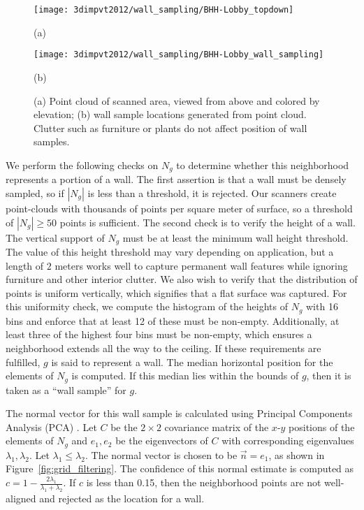 \documentclass[12pt,onecolumn,oneside]{book}
\begin{document}
\begin{figure}

\begin{minipage}[b]{0.45\linewidth}
  \centering
  \centerline{\texttt{[image: 3dimpvt2012/wall\_sampling/BHH-Lobby\_topdown]}}
  \centerline{(a)}\medskip
\end{minipage}
\hfill
\begin{minipage}[b]{0.45\linewidth}
  \centering
  \centerline{\texttt{[image: 3dimpvt2012/wall\_sampling/BHH-Lobby\_wall\_sampling]}}
  \centerline{(b)}\medskip
\end{minipage}

\caption[Wall sampling from static point cloud.]{(a) Point cloud of scanned area, viewed from above and colored by elevation; (b) wall sample locations generated from point cloud.  Clutter such as furniture or plants do not affect position of wall samples.}
\label{fig:bhh_wall_sampling_example}

\end{figure}

We perform the following checks on $N_g$ to determine whether this neighborhood represents a portion of a wall.  The first assertion is that a wall must be densely sampled, so if $|N_g|$ is less than a threshold, it is rejected. Our scanners create point-clouds with thousands of points per square meter of surface, so a threshold of $|N_g| \geq 50$ points is sufficient.  The second check is to verify the height of a wall.  The vertical support of $N_g$ must be at least the minimum wall height threshold. The value of this height threshold may vary depending on application, but a length of $2$ meters works well to capture permanent wall features while ignoring furniture and other interior clutter.  We also wish to verify that the distribution of points is uniform vertically, which signifies that a flat surface was captured.  For this uniformity check, we compute the histogram of the heights of $N_g$ with 16 bins and enforce that at least 12 of these must be non-empty.  Additionally, at least three of the highest four bins must be non-empty, which ensures a neighborhood extends all the way to the ceiling.  If these requirements are fulfilled, $g$ is said to represent a wall.  The median horizontal position for the elements of $N_g$ is computed.  If this median lies within the bounds of $g$, then it is taken as a ``wall sample'' for $g$.

The normal vector for this wall sample is calculated using Principal Components Analysis (PCA) \cite{PCA}.  Let $C$ be the $2 \times 2$ covariance matrix of the $x$-$y$ positions of the elements of $N_g$ and $e_1, e_2$ be the eigenvectors of $C$ with corresponding eigenvalues $\lambda_1, \lambda_2$.  
Let $\lambda_1 \leq \lambda_2$.  The normal vector is chosen to be $\vec{n} = e_1$, as shown in Figure~\ref{fig:grid_filtering}.  The confidence of this normal estimate is computed as $c = 1 - \frac{2 \lambda_1}{\lambda_1 + \lambda_2}$.  If $c$ is less than 0.15, then the neighborhood points are not well-aligned and rejected as the location for a wall.
\end{document}
